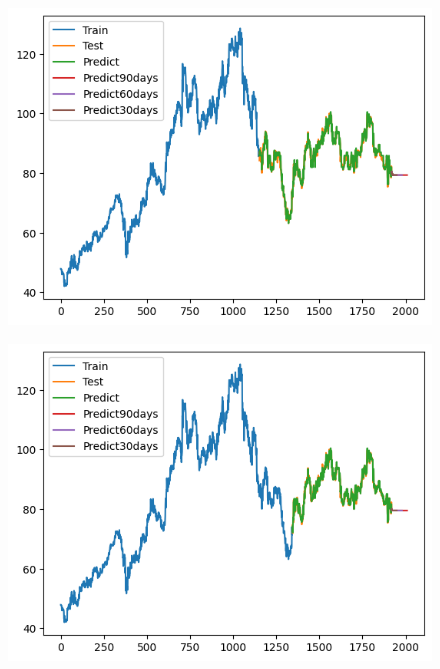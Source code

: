 \documentclass[conference]{IEEEtran}
\begin{document}
\begin{figure}[H]
    \centering
    \begin{minipage}{0.15\textwidth}
    \centering
    \includegraphics[width=1\textwidth]{Image/GradientBoosting/SONY_6_4_GradientBoostingRegressor.png}
   
    \label{fig:1}
    \end{minipage}%
    \begin{minipage}{0.15\textwidth}
    \centering
    \includegraphics[width=1\textwidth]{Image/GradientBoosting/SONY_7_3_GradientBoostingRegressor.png}
  

\end{minipage}
\end{figure}
\end{document}
